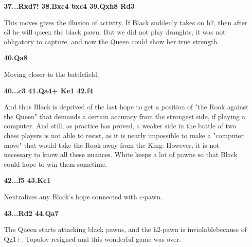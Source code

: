 \documentclass[
	11pt,twocolumn]{article}
\renewcommand{\bf}{\bfseries}
\newcommand{\nf}{\normalfont}
\begin{document}
{\bf 37...Rxd7! 38.Bxc4 bxc4 39.Qxh8 Rd3 }

This moves gives the illusion of activity. If Black suddenly takes on h7, then after c3 he will queen the black pawn. But we did not play draughts, it was not obligatory to capture, and now the Queen could show her true strength.

{\bf 40.Qa8 }

Moving closer to the battlefield.

{\bf 40...c3 41.Qa4+ Ke1 42.f4 }

And thus Black is deprived of the last hope to get a position of "the Rook against the Queen" that demands a certain accuracy from the strongest side, if playing a computer. And still, as practice has proved, a weaker side in the battle of two chess players is not able to resist, as it is nearly impossible to make a "computer move" that would take the Rook away from the King. However, it is not necessary to know all these nuances. White keeps a lot of pawns so that Black could hope to win them sometime.

{\bf 42...f5 43.Kc1 }

Neutralizes any Black's hope connected with c-pawn.

{\bf 43...Rd2 44.Qa7}

The Queen starts attacking black pawns, and the h2-pawn is inviolablebecause of Qg1+. Topalov resigned and this wonderful game was over.







%
%
\end{document}
